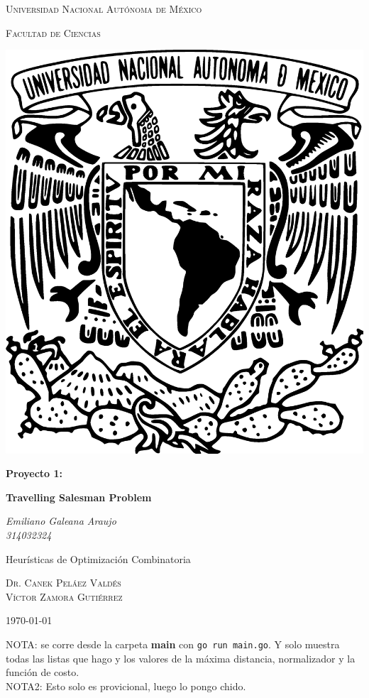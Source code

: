 \documentclass[12pt,a4paper]{article}
\begin{document}
\begin{titlepage}
  \centering
      {\scshape\LARGE Universidad Nacional Autónoma de México \par}
      \vspace{1cm}
	     {\scshape\Large Facultad de Ciencias\par}
	     \vspace{1.2cm}
             \begin{center}
	       \includegraphics[scale=.2]{./imagenes/UNAM.eps}
	     \end{center}
	     \vspace{.5 cm}

	     {\huge\bfseries Proyecto 1: \par}
	     {\huge\bfseries Travelling Salesman Problem\par}
	     \vspace{0.5cm}

	     {\Large\itshape Emiliano Galeana Araujo\\314032324\par}
	     \vfill
	     \vspace{0.5cm}

             Heurísticas de Optimización Combinatoria\par
	     \textsc{Dr. Canek Peláez Valdés}\\
             \textsc{Víctor Zamora Gutiérrez}\\
	     \vspace{0.1cm}
	            {\large \today \par}
\end{titlepage}

NOTA: se corre desde la carpeta \textbf{main} con \texttt{go run main.go}. Y solo
muestra todas las listas que hago y los valores de la máxima distancia,
normalizador y la función de costo.\\
NOTA2: Esto solo es provicional, luego lo pongo chido.
\end{document}
